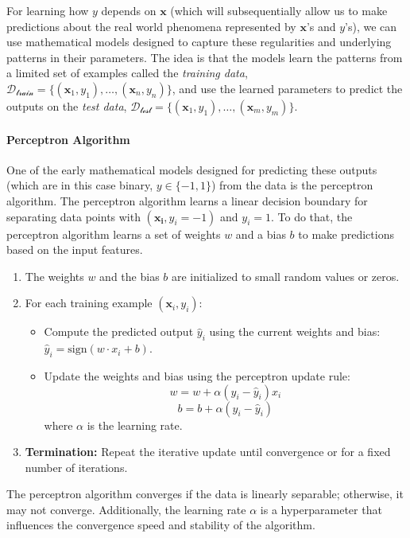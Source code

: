 For learning how $y$ depends on $\mathbf{x}$ (which will subsequentially allow us to make predictions about the real world phenomena represented by $\mathbf{x}$'s and $y$'s), we can use mathematical models designed to capture these regularities and underlying patterns in their parameters. The idea is that the models learn the patterns from a limited set of examples called the \textit{training data},  $\mathcal{D_{\text{train}}} = \{(\mathbf{x}_1, y_1), \ldots, (\mathbf{x}_{n}, y_{n})\}$, and use the learned parameters to predict the outputs on the \textit{test data}, $\mathcal{D_{\text{test}}} = \{(\mathbf{x}_1, y_1), \ldots, (\mathbf{x}_{m}, y_{m})\}$.

\paragraph{Perceptron Algorithm} One of the early mathematical models designed for predicting these outputs (which are in this case binary, $y \in \{-1, 1\}$) from the data is the perceptron algorithm. The perceptron algorithm learns a linear decision boundary for separating data points with $(\mathbf{x_i}, y_i = -1)$ and $y_i = 1$. To do that, the perceptron algorithm learns a set of weights $w$ and a bias $b$ to make predictions based on the input features.




\begin{enumerate}
    \item The weights $w$ and the bias $b$ are initialized to small random values or zeros.
    \item For each training example $(\mathbf{x}_i, y_i)$:
          \begin{itemize}
              \item Compute the predicted output $\hat{y}_i$ using the current weights and bias: $\hat{y}_i = \text{sign}(w \cdot x_i + b)$.
              \item Update the weights and bias using the perceptron update rule:
                    \[ w = w + \alpha (y_i - \hat{y}_i) x_i \]
                    \[ b = b + \alpha (y_i - \hat{y}_i) \]
                    where $\alpha$ is the learning rate.
          \end{itemize}
    \item \textbf{Termination:} Repeat the iterative update until convergence or for a fixed number of iterations.
\end{enumerate}

The perceptron algorithm converges if the data is linearly separable; otherwise, it may not converge. Additionally, the learning rate $\alpha$ is a hyperparameter that influences the convergence speed and stability of the algorithm.




